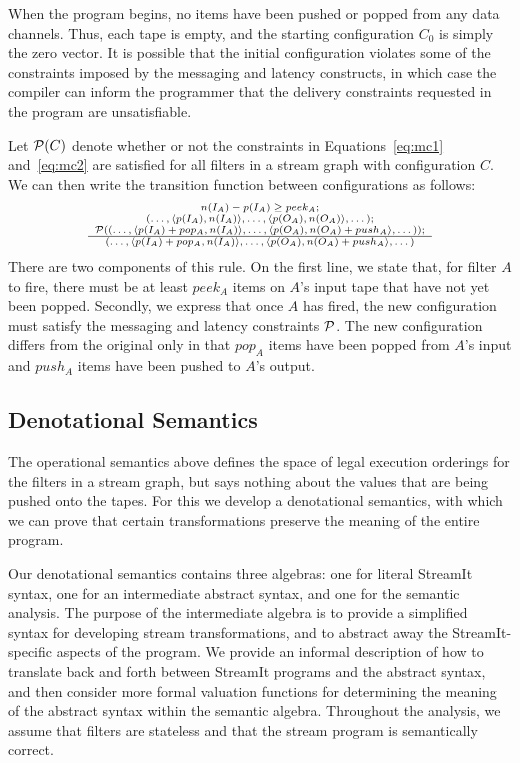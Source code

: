 When the program begins, no items have been pushed or popped from any
data channels.  Thus, each tape is empty, and the starting
configuration $C_0$ is simply the zero vector.  It is possible that
the initial configuration violates some of the constraints imposed by
the messaging and latency constructs, in which case the compiler can
inform the programmer that the delivery constraints requested in the
program are unsatisfiable.

Let ${\cal P}(C)$ denote whether or not the constraints in
Equations~\ref{eq:mc1} and~\ref{eq:mc2} are satisfied for all filters
in a stream graph with configuration $C$.  We can then write the
transition function between configurations as follows:
\[
\begin{scriptsize}
\begin{array}{c}
n(I_A) - p(I_A) \ge peek_A; \\ (\dots , \langle p(I_A), n(I_A) \rangle, \dots,
\langle p(O_A), n(O_A) \rangle, \dots); \\ {\cal P}((\dots , \langle p(I_A)+pop_A, n(I_A) \rangle, \dots,
\langle p(O_A), n(O_A)+push_A \rangle, \dots)); \\ \hline (\dots , \langle p(I_A)+pop_A,
n(I_A) \rangle, \dots, \langle p(O_A), n(O_A)+push_A \rangle, \dots)
\end{array}
\end{scriptsize}
\]
There are two components of this rule.  On the first line, we state
that, for filter $A$ to fire, there must be at least $peek_A$ items on
$A$'s input tape that have not yet been popped.  Secondly, we express
that once $A$ has fired, the new configuration must satisfy the
messaging and latency constraints ${\cal P}$.  The new configuration differs
from the original only in that $pop_A$ items have been popped from
$A$'s input and $push_A$ items have been pushed to $A$'s output.

\subsection{Denotational Semantics}

The operational semantics above defines the space of legal execution
orderings for the filters in a stream graph, but says nothing about
the values that are being pushed onto the tapes.  For this we develop
a denotational semantics, with which we can prove that certain
transformations preserve the meaning of the entire program.

Our denotational semantics contains three algebras: one for literal
StreamIt syntax, one for an intermediate abstract syntax, and one for
the semantic analysis.  The purpose of the intermediate algebra is to
provide a simplified syntax for developing stream transformations, and
to abstract away the StreamIt-specific aspects of the program.  We
provide an informal description of how to translate back and forth
between StreamIt programs and the abstract syntax, and then consider
more formal valuation functions for determining the meaning of the
abstract syntax within the semantic algebra.  Throughout the analysis,
we assume that filters are stateless and that the stream program is
semantically correct.

